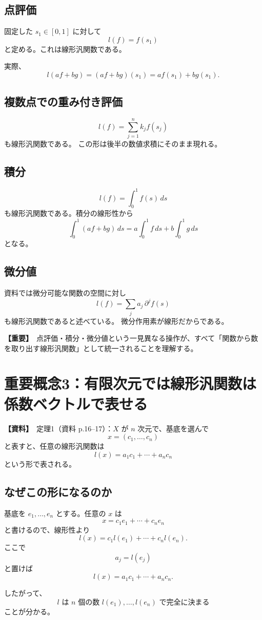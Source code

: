 \documentclass[a4paper,11pt]{ltjsarticle}
\newcommand{\sourceitem}{\textbf{【資料】}}
\newcommand{\highimportance}{\textbf{【重要】}}
\begin{document}
\subsection{点評価}
固定した $s_1\in[0,1]$ に対して
\[
 l(f)=f(s_1)
\]
と定める。これは線形汎関数である。

実際、
\[
 l(af+bg)=(af+bg)(s_1)=af(s_1)+bg(s_1).
\]

\subsection{複数点での重み付き評価}
\[
 l(f)=\sum_{j=1}^n k_j f(s_j)
\]
も線形汎関数である。
この形は後半の数値求積にそのまま現れる。

\subsection{積分}
\[
 l(f)=\int_0^1 f(s)\,ds
\]
も線形汎関数である。積分の線形性から
\[
\int_0^1(af+bg)\,ds
=a\int_0^1f\,ds+b\int_0^1g\,ds
\]
となる。

\subsection{微分値}
資料では微分可能な関数の空間に対し
\[
 l(f)=\sum_j a_j\,\partial^j f(s)
\]
も線形汎関数であると述べている。
微分作用素が線形だからである。

\highimportance\ 点評価・積分・微分値という一見異なる操作が、すべて「関数から数を取り出す線形汎関数」として統一されることを理解する。

\section{重要概念3：有限次元では線形汎関数は係数ベクトルで表せる}

\sourceitem\ 定理1（資料 p.16--17）：$X$ が $n$ 次元で、基底を選んで
\[
 x=(c_1,\dots,c_n)
\]
と表すと、任意の線形汎関数は
\[
\boxed{
 l(x)=a_1c_1+\cdots+a_nc_n
}
\]
という形で表される。

\subsection{なぜこの形になるのか}
基底を $e_1,\dots,e_n$ とする。任意の $x$ は
\[
 x=c_1e_1+\cdots+c_ne_n
\]
と書けるので、線形性より
\[
 l(x)
 =c_1l(e_1)+\cdots+c_nl(e_n).
\]
ここで
\[
 a_j=l(e_j)
\]
と置けば
\[
 l(x)=a_1c_1+\cdots+a_nc_n.
\]

したがって、
\[
\boxed{l\text{ は }n\text{ 個の数 }l(e_1),\dots,l(e_n)\text{ で完全に決まる}}
\]
ことが分かる。
\end{document}
